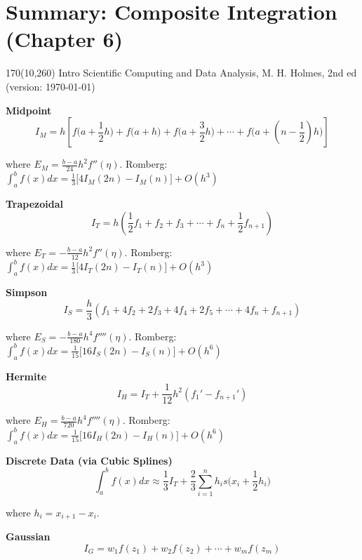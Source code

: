 \documentclass[12pt]{article}
\begin{document}
\pagestyle{empty}

\section*{Summary: Composite Integration (Chapter 6)}

\begin{textblock}{170}(10,260)
\noindent \textsf{{\small Intro Scientific Computing and Data Analysis, M. H. Holmes, 2nd ed (version: \today)}}
\end{textblock}


\bigskip\bigskip\bigskip\noindent
\textbf{Midpoint}
\[
I_M =h  \! \left [  f \! \Big ( a+\frac{1}{2}h \Big  ) +f \! \Big ( a+h \Big  ) +f \! \Big ( a+\frac{3}{2}h  \Big  ) + \cdots + f \! \Big ( a+(n-\frac{1}{2})h \Big  ) \right ]
\tag{6.9}
\]

\medskip
where $E_M= \frac{b-a}{24} h^2 f''(\eta)$.  Romberg: $\int_a^b f(x)dx =  \frac{1}{3} \big [ 4I_M(2n)-I_M(n) \big ] +O(h^3)$

\bigskip\bigskip\bigskip\bigskip\noindent
\textbf{Trapezoidal}
\[
I_T=h \! \left (\frac{1}{2} f_1 + f_2 + f_3 + \cdots + f_n + \frac{1}{2}f_{n+1} \right )
\tag{6.15}
\]

\medskip
where $E_T= - \frac{b-a}{12} h^2 f''(\eta)$.   Romberg: $\int_a^b f(x)dx = \frac{1}{3} \big [ 4I_T(2n)-I_T(n) \big ]  +O(h^3)$

\bigskip\bigskip\bigskip\bigskip\noindent
\textbf{Simpson}
\[
I_S=\frac{h}{3}  \! \left ( f_1 + 4f_2 + 2 f_3 + 4f_4 + 2 f_5 + \cdots + 4f_n + f_{n+1} \right )
\tag{6.22}
\]

\medskip
where  $E_S= -\frac{b-a}{180} h^4 f''''(\eta)$.    Romberg: $\int_a^b f(x)dx =  \frac{1}{15} \big [ 16I_S(2n)-I_S(n) \big ]  +O(h^6)$


\bigskip\bigskip\bigskip\bigskip\noindent
\textbf{Hermite}
\[
I_H=I_T+ \frac{1}{12} h^2 \! \left ( f_1'-f_{n+1}' \right )
\tag{6.28}
\]

\medskip
where  $E_H= \frac{b-a}{720} h^4 f''''(\eta)$.  Romberg: $\int_a^b f(x)dx =  \frac{1}{15} \big [ 16I_H(2n)-I_H(n) \big ] +O(h^6)$

\bigskip\bigskip\bigskip\bigskip\noindent
\textbf{Discrete Data (via Cubic Splines)}
\[
\int_a^b f(x)dx \approx  \frac{1}{3} I_T + \frac{2}{3}  \sum_{i=1}^n h_i s \! \bigg (x_i+\frac{1}{2} h_i \bigg )
\tag{6.40}
\]

\medskip
where $h_i=x_{i+1}-x_i$.



\newpage\noindent
\textbf{Gaussian}
\[
I_G =  w_1 f(z_1) + w_2 f(z_2) +  \cdots + w_m f(z_m) 
\tag{6.42}
\]
\end{document}

